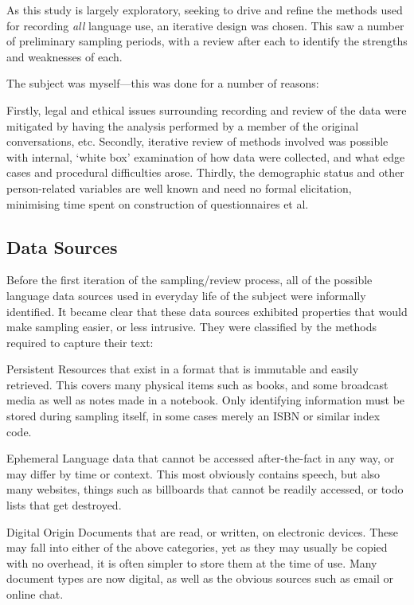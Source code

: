 As this study is largely exploratory, seeking to drive and refine the methods used for recording \textsl{all} language use, an iterative design was chosen.  This saw a number of preliminary sampling periods, with a review after each to identify the strengths and weaknesses of each.

The subject was myself---this was done for a number of reasons:

Firstly, legal and ethical issues surrounding recording and review of the data were mitigated by having the analysis performed by a member of the original conversations, etc.
Secondly, iterative review of methods involved was possible with internal, `white box' examination of how data were collected, and what edge cases and procedural difficulties arose.
Thirdly, the demographic status and other person-related variables are well known and need no formal elicitation, minimising time spent on construction of questionnaires et al.


\subsection{Data Sources}
Before the first iteration of the sampling/review process, all of the possible language data sources used in everyday life of the subject were informally identified.  It became clear that these data sources exhibited properties that would make sampling easier, or less intrusive.  They were classified by the methods required to capture their text:

\begin{itemizeTitle}
    \item[Persistent] Resources that exist in a format that is immutable and easily retrieved.  This covers many physical items such as books, and some broadcast media as well as notes made in a notebook.  Only identifying information must be stored during sampling itself, in some cases merely an ISBN or similar index code.
    \item[Ephemeral] Language data that cannot be accessed after-the-fact in any way, or may differ by time or context.  This most obviously contains speech, but also many websites, things such as billboards that cannot be readily accessed, or todo lists that get destroyed.
    \item[Digital Origin] Documents that are read, or written, on electronic devices.  These may fall into either of the above categories, yet as they may usually be copied with no overhead, it is often simpler to store them at the time of use.  Many document types are now digital, as well as the obvious sources such as email or online chat.
\end{itemizeTitle}

